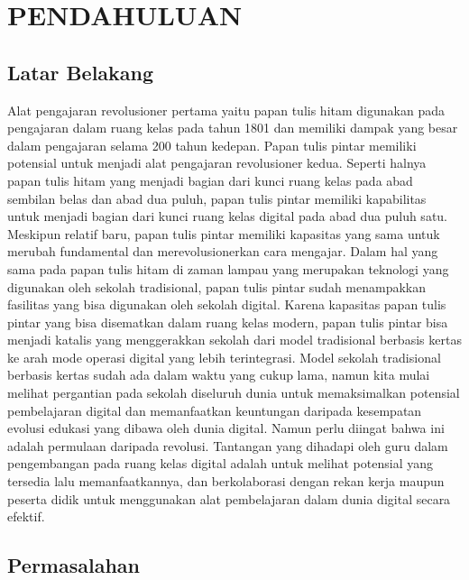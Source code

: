 \section{PENDAHULUAN}

\subsection{Latar Belakang} 

Alat pengajaran revolusioner pertama yaitu papan tulis hitam digunakan pada pengajaran dalam ruang kelas pada tahun 1801 dan memiliki dampak yang besar dalam pengajaran selama 200 tahun kedepan. Papan tulis pintar memiliki potensial untuk menjadi alat pengajaran revolusioner kedua. Seperti halnya papan tulis hitam yang menjadi bagian dari kunci ruang kelas pada abad sembilan belas dan abad dua puluh, papan tulis pintar memiliki kapabilitas untuk menjadi bagian dari kunci ruang kelas digital pada abad dua puluh satu. Meskipun relatif baru, papan tulis pintar memiliki kapasitas yang sama untuk merubah fundamental dan merevolusionerkan cara mengajar.
Dalam hal yang sama pada papan tulis hitam di zaman lampau yang merupakan teknologi yang digunakan oleh sekolah tradisional, papan tulis pintar sudah menampakkan fasilitas yang bisa digunakan oleh sekolah digital. Karena kapasitas papan tulis pintar yang bisa disematkan dalam ruang kelas modern, papan tulis pintar bisa menjadi katalis yang menggerakkan sekolah dari model tradisional berbasis kertas ke arah mode operasi digital yang lebih terintegrasi. Model sekolah tradisional berbasis kertas sudah ada dalam waktu yang cukup lama, namun kita mulai melihat pergantian pada sekolah diseluruh dunia untuk memaksimalkan potensial pembelajaran digital dan memanfaatkan keuntungan daripada kesempatan evolusi edukasi yang dibawa oleh dunia digital.
Namun perlu diingat bahwa ini adalah permulaan daripada revolusi. Tantangan yang dihadapi oleh guru dalam pengembangan pada ruang kelas digital adalah untuk melihat potensial yang tersedia lalu memanfaatkannya, dan berkolaborasi dengan rekan kerja maupun peserta didik untuk menggunakan alat pembelajaran dalam dunia digital secara efektif.  \citep{Lant2016}



\subsection{Permasalahan}

